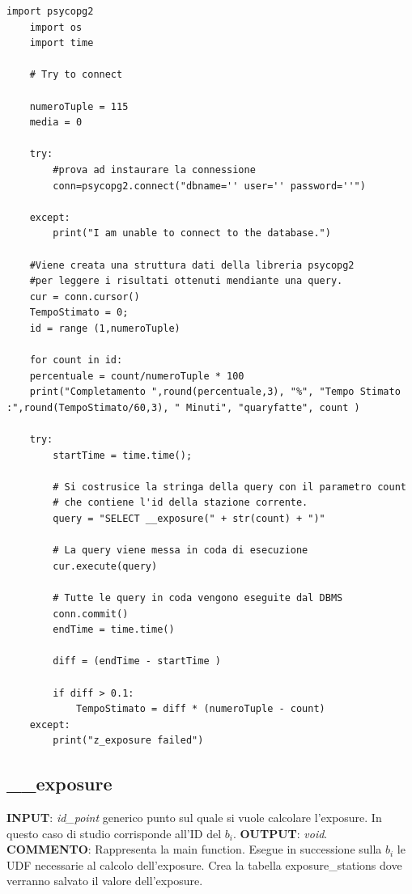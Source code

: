 \begin{lstlisting}[style = python]
	import psycopg2
	import os
	import time
	
	# Try to connect

	numeroTuple = 115
	media = 0
	
	try:
		#prova ad instaurare la connessione
		conn=psycopg2.connect("dbname='' user='' password=''")

	except:
		print("I am unable to connect to the database.")
	
	#Viene creata una struttura dati della libreria psycopg2
	#per leggere i risultati ottenuti mendiante una query.
	cur = conn.cursor()
	TempoStimato = 0;
	id = range (1,numeroTuple)

	for count in id:
	percentuale = count/numeroTuple * 100
	print("Completamento ",round(percentuale,3), "%", "Tempo Stimato :",round(TempoStimato/60,3), " Minuti", "quaryfatte", count )

	try:
		startTime = time.time();
		
		# Si costrusice la stringa della query con il parametro count 
		# che contiene l'id della stazione corrente.
		query = "SELECT __exposure(" + str(count) + ")"
		
		# La query viene messa in coda di esecuzione
		cur.execute(query)
		
		# Tutte le query in coda vengono eseguite dal DBMS
		conn.commit()
		endTime = time.time()

		diff = (endTime - startTime )
		
		if diff > 0.1:
			TempoStimato = diff * (numeroTuple - count)
	except:
		print("z_exposure failed")

\end{lstlisting}


\subsection{\_\_exposure}
\textbf{INPUT}: \textit{id\_point} generico punto sul quale si vuole calcolare l'exposure. In questo caso di studio corrisponde all'ID del $b_i$.\newline
\textbf{OUTPUT}: \textit{void}. \newline
\textbf{COMMENTO}: Rappresenta la main function. Esegue in successione sulla $b_i$ le UDF necessarie al calcolo dell'exposure. Crea la tabella exposure\_stations dove verranno salvato il valore dell'exposure.   


